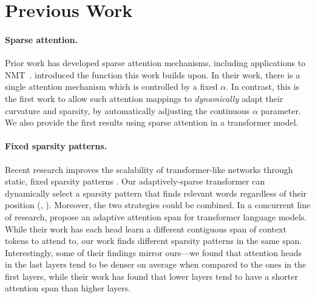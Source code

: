 \section{Previous Work}

\paragraph*{Sparse attention.}
Prior work has developed sparse attention mechanisms, including
applications to NMT~\citep{sparsemax, malaviya2018sparse, fusedmax,
    shao2019ssn, maruf2019selective}. \citet{entmax} introduced the
\entmaxtext function this work builds upon. In their work, there is a
single attention mechanism which is controlled by a fixed $\alpha$.
In contrast, this is the first work to allow such attention mappings
to \emph{dynamically} adapt their curvature and sparsity, by
automatically adjusting the continuous $\alpha$ parameter. We also
provide the first results using sparse attention in a transformer
model.

\paragraph*{Fixed sparsity patterns.}
Recent research improves the scalability of transformer-like networks
through static, fixed sparsity patterns
\citep{openai_sparse_transf,dynamic_conv}. Our adaptively-sparse
transformer can dynamically select a sparsity pattern that finds
relevant words regardless of their position (\eg,
). Moreover, the two strategies could be
combined. In a concurrent line of research, \citet{Sukhbaatar2019}
propose an adaptive attention span for transformer language models.
While their work has each head learn a different contiguous span of
context tokens to attend to, our work finds different sparsity
patterns in the same span. Interestingly, some of their findings
mirror ours---we found that attention heads in the last layers tend
to be denser on average when compared to the ones in the first
layers, while their work has found that lower layers tend to have a
shorter attention span than higher layers.

